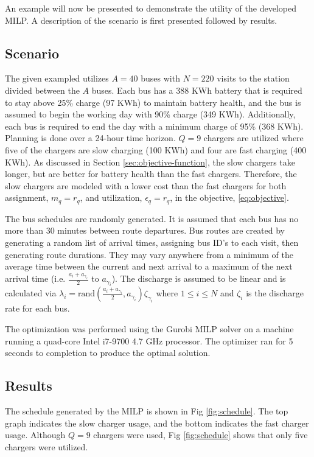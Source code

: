 \documentclass[letterpaper, 10pt, conference]{IEEEtran}
\begin{document}
An example will now be presented to demonstrate the utility of the developed MILP. A description of the scenario is
first presented followed by results.

\subsection{Scenario}
The given exampled utilizes $A = 40$ buses with $N = 220$ visits to the station divided between the $A$ buses. Each bus
has a 388 KWh battery that is required to stay above 25\% charge (97 KWh) to maintain battery health, and the bus is
assumed to begin the working day with 90\% charge (349 KWh). Additionally, each bus is required to end the day with a
minimum charge of 95\% (368 KWh). Planning is done over a 24-hour time horizon. $Q = 9$ chargers are utilized where five
of the chargers are slow charging (100 KWh) and four are fast charging (400 KWh). As discussed in Section
\ref{sec:objective-function}, the slow chargers take longer, but are better for battery health than the fast chargers.
Therefore, the slow chargers are modeled with a lower cost than the fast chargers for both assignment, $m_q = r_q$, and
utilization, $\epsilon_q = r_q$, in the objective, \eqref{eq:objective}.

The bus schedules are randomly generated. It is assumed that each bus has no more than 30 minutes between route
departures. Bus routes are created by generating a random list of arrival times, assigning bus ID's to each visit, then
generating route durations. They may vary anywhere from a minimum of the average time between the current and next
arrival to a maximum of the next arrival time (i.e. $\frac{a_i + a_{\gamma_i}}{2}$ to $a_{\gamma_i}$). The discharge is assumed to
be linear and is calculated via $\lambda_i = \text{rand}(\frac{a_i + a_{\gamma_i}}{2},a_{\gamma_i})\zeta_{\gamma_i}$ where $1 \leq i \leq N$ and $\zeta_i$
is the discharge rate for each bus.

The optimization was performed using the Gurobi MILP solver \cite{Hespanha2018} on a machine running a quad-core Intel
i7-9700 4.7 GHz processor. The optimizer ran for 5 seconds to completion to produce the optimal solution.

\subsection{Results}
The schedule generated by the MILP is shown in Fig \ref{fig:schedule}. The top graph indicates the slow charger usage,
and the bottom indicates the fast charger usage. Although $Q = 9$ chargers were used, Fig \ref{fig:schedule} shows that
only five chargers were utilized.
\end{document}
